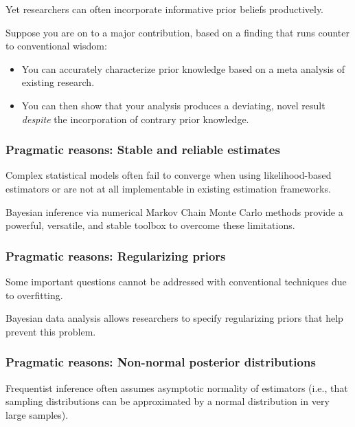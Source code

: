 \documentclass[
  11pt,
]{article}
\providecommand{\tightlist}{%
  \setlength{\itemsep}{0pt}\setlength{\parskip}{0pt}}
\begin{document}
Yet researchers can often incorporate informative prior beliefs
productively.

Suppose you are on to a major contribution, based on a finding that runs
counter to conventional wisdom:

\begin{itemize}
\tightlist
\item
  You can accurately characterize prior knowledge based on a meta
  analysis of existing research.
\item
  You can then show that your analysis produces a deviating, novel
  result \emph{despite} the incorporation of contrary prior knowledge.
\end{itemize}

\hypertarget{pragmatic-reasons-stable-and-reliable-estimates}{%
\subsubsection{Pragmatic reasons: Stable and reliable estimates}\label{pragmatic-reasons-stable-and-reliable-estimates}}

Complex statistical models often fail to converge when using
likelihood-based estimators or are not at all implementable in existing
estimation frameworks.

Bayesian inference via numerical Markov Chain Monte Carlo methods
provide a powerful, versatile, and stable toolbox to overcome these
limitations.

\hypertarget{pragmatic-reasons-regularizing-priors}{%
\subsubsection{Pragmatic reasons: Regularizing priors}\label{pragmatic-reasons-regularizing-priors}}

Some important questions cannot be addressed with conventional
techniques due to overfitting.

Bayesian data analysis allows researchers to specify regularizing priors
that help prevent this problem.

\hypertarget{pragmatic-reasons-non-normal-posterior-distributions}{%
\subsubsection{Pragmatic reasons: Non-normal posterior distributions}\label{pragmatic-reasons-non-normal-posterior-distributions}}

Frequentist inference often assumes asymptotic normality of estimators
(i.e., that sampling distributions can be approximated by a normal
distribution in very large samples).
\end{document}
